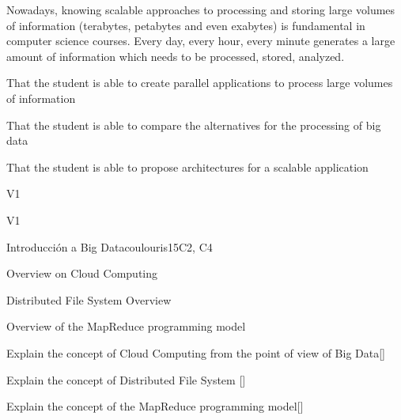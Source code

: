 \begin{syllabus}


\begin{justification}
Nowadays, knowing scalable approaches to processing and storing large volumes of information (terabytes, petabytes and even exabytes) is fundamental in computer science courses. Every day, every hour, every minute generates a large amount of information which needs to be processed, stored, analyzed.
\end{justification}

\begin{goals}
\item That the student is able to create parallel applications to process large volumes of information
\item That the student is able to compare the alternatives for the processing of big data
\item That the student is able to propose architectures for a scalable application
\end{goals}

\begin{outcomes}{V1}
    \item {} 
    \item {} 
    \item {} 
    \item {} 
\end{outcomes}

\begin{competences}{V1}
    \item {}
    \item {}
    \item {} 
    \item {} 
    \item {} 
    \item {} 
\end{competences}

\begin{unit}{Introducción a Big Data}{}{coulouris}{15}{C2, C4}
\begin{topics}%
        \item Overview on Cloud Computing 
        \item Distributed File System Overview%
        \item Overview of the MapReduce programming model%
\end{topics}
\begin{learningoutcomes}%
        \item Explain the concept of Cloud Computing from the point of view of Big Data[\Familiarity] %
        \item Explain the concept of Distributed File System [\Familiarity] %
        \item Explain the concept of the MapReduce programming model[\Familiarity] %
\end{learningoutcomes}%
\end{unit}


\end{syllabus}
